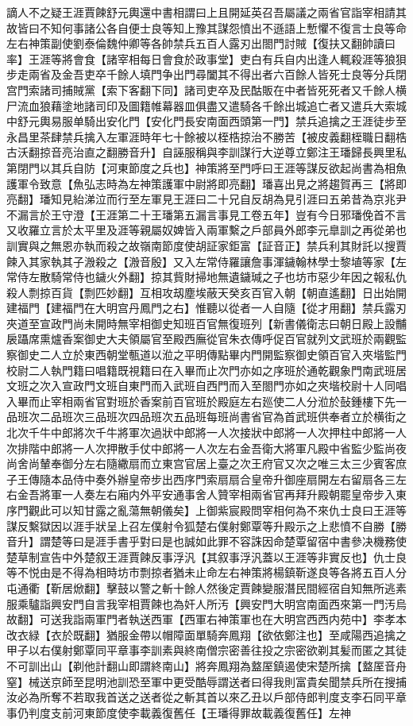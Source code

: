 謫人不之疑王涯賈餗舒元輿還中書相謂曰上且開延英召吾屬議之兩省官詣宰相請其故皆曰不知何事諸公各自便士良等知上豫其謀怨憤出不遜語上慙懼不復言士良等命左右神策副使劉泰倫魏仲卿等各帥禁兵五百人露刃出閤門討賊【復扶又翻帥讀曰率】王涯等將會食【諸宰相每日會食於政事堂】吏白有兵自内出逢人輒殺涯等狼狽步走兩省及金吾吏卒千餘人填門争出門尋闔其不得出者六百餘人皆死士良等分兵閉宫門索諸司捕賊黨【索下客翻下同】諸司吏卒及民酤販在中者皆死死者又千餘人横尸流血狼藉塗地諸司印及圖籍帷幕器皿俱盡又遣騎各千餘出城追亡者又遣兵大索城中舒元輿易服单騎出安化門【安化門長安南面西頭第一門】禁兵追擒之王涯徒步至永昌里茶肆禁兵擒入左軍涯時年七十餘被以桎梏掠治不勝苦【被皮義翻桎職日翻梏古沃翻掠音亮治直之翻勝音升】自誣服稱與李訓謀行大逆尊立鄭注王璠歸長興里私第閉門以其兵自防【河東節度之兵也】神策將至門呼曰王涯等謀反欲起尚書為相魚護軍令致意【魚弘志時為左神策護軍中尉將即亮翻】璠喜出見之將趨賀再三【將即亮翻】璠知見紿涕泣而行至左軍見王涯曰二十兄自反胡為見引涯曰五弟昔為京兆尹不漏言於王守澄【王涯第二十王璠第五漏言事見工卷五年】豈有今日邪璠俛首不言又收羅立言於太平里及涯等親屬奴婢皆入兩軍繫之戶部員外郎李元臯訓之再從弟也訓實與之無恩亦執而殺之故嶺南節度使胡証家鉅富【証音正】禁兵利其財託以搜賈餗入其家執其子溵殺之【溵音殷】又入左常侍羅讓詹事渾鐬翰林學士黎埴等家【左常侍左散騎常侍也鐬火外翻】掠其貲財掃地無遺鐬瑊之子也坊市惡少年因之報私仇殺人剽掠百貨【剽匹妙翻】互相攻刼塵埃蔽天癸亥百官入朝【朝直遙翻】日出始開建福門【建福門在大明宫丹鳳門之右】惟聽以從者一人自隨【從才用翻】禁兵露刃夾道至宣政門尚未開時無宰相御史知班百官無復班列【新書儀衛志曰朝日殿上設黼扆躡席熏爐香案御史大夫領屬官至殿西廡從官朱衣傳呼促百官就列文武班於兩觀監察御史二人立於東西朝堂甎道以涖之平明傳點畢内門開監察御史領百官入夾堦監門校尉二人執門籍曰唱籍既視籍曰在入畢而止次門亦如之序班於通乾觀象門南武班居文班之次入宣政門文班自東門而入武班自西門而入至閤門亦如之夾堦校尉十人同唱入畢而止宰相兩省官對班於香案前百官班於殿庭左右廵使二人分涖於鼔鍾樓下先一品班次二品班次三品班次四品班次五品班每班尚書省官為首武班供奉者立於横街之北次千牛中郎將次千牛將軍次過狀中郎將一人次接狀中郎將一人次押柱中郎將一人次排階中郎將一人次押散手仗中郎將一人次左右金吾衛大將軍凡殿中省監少監尚夜尚舍尚輦奉御分左右隨繖扇而立東宫官居上臺之次王府官又次之唯三太三少賓客庶子王傳隨本品侍中奏外辦皇帝步出西序門索扇扇合皇帝升御座扇開左右留扇各三左右金吾將軍一人奏左右廂内外平安通事舍人贊宰相兩省官再拜升殿朝罷皇帝步入東序門觀此可以知甘露之亂蕩無朝儀矣】上御紫宸殿問宰相何為不來仇士良曰王涯等謀反繫獄因以涯手狀呈上召左僕射令狐楚右僕射鄭覃等升殿示之上悲憤不自勝【勝音升】謂楚等曰是涯手書乎對曰是也誠如此罪不容誅因命楚覃留宿中書參决機務使楚草制宣告中外楚叙王涯賈餗反事浮汎【其叙事浮汎蓋以王涯等非實反也】仇士良等不悦由是不得為相時坊市剽掠者猶未止命左右神策將楊鎮靳遂良等各將五百人分屯通衢【靳居焮翻】擊鼓以警之斬十餘人然後定賈餗變服潛民間經宿自知無所逃素服乘驢詣興安門自言我宰相賈餗也為奸人所汚【興安門大明宫南面西來第一門汚烏故翻】可送我詣兩軍門者執送西軍【西軍右神策軍也在大明宫西西内苑中】李孝本改衣緑【衣於既翻】猶服金帶以帽障面單騎奔鳳翔【欲依鄭注也】至咸陽西追擒之甲子以右僕射鄭覃同平章事李訓素與終南僧宗密善往投之宗密欲剃其髪而匿之其徒不可訓出山【剃他計翻山即謂終南山】將奔鳳翔為盩厔鎮遏使宋楚所擒【盩厔音舟窒】械送京師至昆明池訓恐至軍中更受酷辱謂送者曰得我則富貴矣聞禁兵所在搜捕汝必為所奪不若取我首送之送者從之斬其首以來乙丑以戶部侍郎判度支李石同平章事仍判度支前河東節度使李載義復舊任【王璠得罪故載義復舊任】左神
